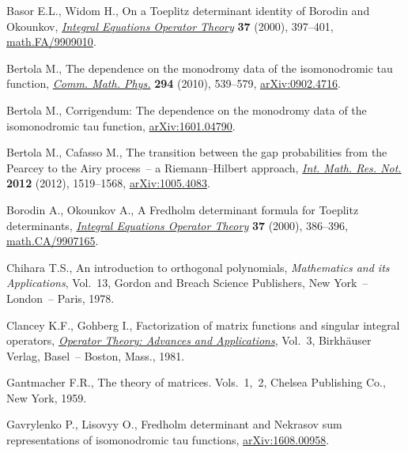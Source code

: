 \documentclass[pdftex]{sigma}
\numberwithin{equation}{section}
\begin{document}
\begin{thebibliography}{99}
\footnotesize\itemsep=0pt

Basor E.L., Widom H., On a {T}oeplitz determinant identity of {B}orodin and
 {O}kounkov, \href{https://doi.org/10.1007/BF01192828}{\textit{Integral Equations Operator Theory}} \textbf{37} (2000),
 397--401, \href{https://arxiv.org/abs/math.FA/9909010}{math.FA/9909010}.

Bertola M., The dependence on the monodromy data of the isomonodromic tau
 function, \href{https://doi.org/10.1007/s00220-009-0961-7}{\textit{Comm. Math. Phys.}} \textbf{294} (2010), 539--579,
 \href{https://arxiv.org/abs/0902.4716}{arXiv:0902.4716}.

Bertola M., Corrigendum: {T}he dependence on the monodromy data of the
 isomonodromic tau function, \href{https://arxiv.org/abs/1601.04790}{arXiv:1601.04790}.

Bertola M., Cafasso M., The transition between the gap probabilities from the
 {P}earcey to the {A}iry process~-- a {R}iemann--{H}ilbert approach,
 \href{https://doi.org/10.1093/imrn/rnr066}{\textit{Int. Math. Res. Not.}} \textbf{2012} (2012), 1519--1568,
 \href{https://arxiv.org/abs/1005.4083}{arXiv:1005.4083}.

Borodin A., Okounkov A., A {F}redholm determinant formula for {T}oeplitz
 determinants, \href{https://doi.org/10.1007/BF01192827}{\textit{Integral Equations Operator Theory}} \textbf{37} (2000),
 386--396, \href{https://arxiv.org/abs/math.CA/9907165}{math.CA/9907165}.

Chihara T.S., An introduction to orthogonal polynomials, \textit{Mathematics and
 its Applications}, Vol.~13, Gordon and
 Breach Science Publishers, New York~-- London~-- Paris, 1978.

Clancey K.F., Gohberg I., Factorization of matrix functions and singular
 integral operators, \href{https://doi.org/10.1007/978-3-0348-5492-4}{\textit{Operator Theory: Advances and Applications}},
 Vol.~3, Birkh\"auser Verlag, Basel~-- Boston, Mass., 1981.

Gantmacher F.R., The theory of matrices. {V}ols.~1,~2, Chelsea Publishing Co.,
 New York, 1959.

Gavrylenko P., Lisovyy O., Fredholm determinant and Nekrasov sum
 representations of isomonodromic tau functions, \href{https://arxiv.org/abs/1608.00958}{arXiv:1608.00958}.


\end{thebibliography}
\end{document}
